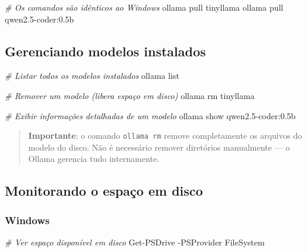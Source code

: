 \documentclass[
]{article}
\newenvironment{Shaded}{\begin{snugshade}}{\end{snugshade}}
\newcommand{\AttributeTok}[1]{\textcolor[rgb]{0.13,0.29,0.53}{#1}}
\newcommand{\CommentTok}[1]{\textcolor[rgb]{0.56,0.35,0.01}{\textit{#1}}}
\newcommand{\ExtensionTok}[1]{#1}
\newcommand{\NormalTok}[1]{#1}
\begin{document}
\begin{Shaded}
\begin{Highlighting}[]
\CommentTok{\# Os comandos são idênticos ao Windows}
\ExtensionTok{ollama}\NormalTok{ pull tinyllama}
\ExtensionTok{ollama}\NormalTok{ pull qwen2.5{-}coder:0.5b}
\end{Highlighting}
\end{Shaded}

\subsection{Gerenciando modelos
instalados}\label{gerenciando-modelos-instalados}

\begin{Shaded}
\begin{Highlighting}[]
\CommentTok{\# Listar todos os modelos instalados}
\ExtensionTok{ollama}\NormalTok{ list}

\CommentTok{\# Remover um modelo (libera espaço em disco)}
\ExtensionTok{ollama}\NormalTok{ rm tinyllama}

\CommentTok{\# Exibir informações detalhadas de um modelo}
\ExtensionTok{ollama}\NormalTok{ show qwen2.5{-}coder:0.5b}
\end{Highlighting}
\end{Shaded}

\begin{quote}
\textbf{Importante}: o comando \texttt{ollama\ rm} remove completamente
os arquivos do modelo do disco. Não é necessário remover diretórios
manualmente --- o Ollama gerencia tudo internamente.
\end{quote}

\subsection{Monitorando o espaço em
disco}\label{monitorando-o-espauxe7o-em-disco}

\subsubsection{Windows}\label{windows}

\begin{Shaded}
\begin{Highlighting}[]
\CommentTok{\# Ver espaço disponível em disco}
\ExtensionTok{Get{-}PSDrive} \AttributeTok{{-}PSProvider}\NormalTok{ FileSystem}
\end{Highlighting}
\end{Shaded}
\end{document}
